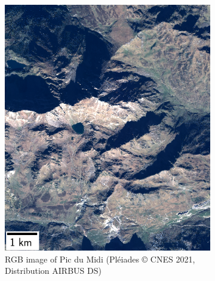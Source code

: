 \begin{figure}
    \centering
    \begin{subfigure}[t]{0.48\linewidth}
        \flushleft
        \includegraphics[width=\linewidth]{Images/Chap_6/miniature_Pic_du_midi.png}
        \caption{RGB image of Pic du Midi (Pléiades © CNES 2021, Distribution AIRBUS DS)}
        \label{fig:miniature_pic_du_midi_rgb}
    \end{subfigure}\hfill
    \begin{subfigure}[t]{0.48\linewidth}
        \flushright

\end{subfigure}
\end{figure}
